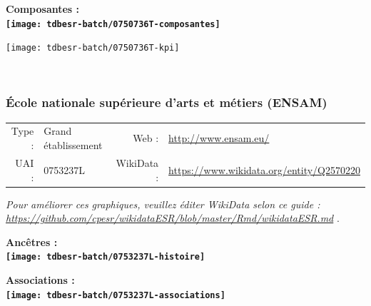 \documentclass[12pt,french,]{article}
\begin{document}
\hrulefill

\begin{center} \bf Composantes : \\  
\texttt{[image: tdbesr-batch/0750736T-composantes]} \end{center}

\begin{center}\texttt{[image: tdbesr-batch/0750736T-kpi]} \end{center}\checkoddpage

\ifoddpage \fi ~\newpage  

\hypertarget{uxe9cole-nationale-supuxe9rieure-darts-et-muxe9tiers-ensam}{%
\subsubsection{École nationale supérieure d'arts et métiers
(ENSAM)}\label{uxe9cole-nationale-supuxe9rieure-darts-et-muxe9tiers-ensam}}

\begin{tabular*}{\textwidth}{rp{5cm}rl}  
\hline  
Type : & Grand établissement & Web : &\href{http://www.ensam.eu/}{http://www.ensam.eu/} \\  
UAI : & 0753237L & WikiData : & \href{https://www.wikidata.org/entity/Q2570220}{https://www.wikidata.org/entity/Q2570220} \\  
\hline  
\end{tabular*}

\textit{\scriptsize Pour améliorer ces graphiques, veuillez éditer WikiData selon ce guide :  \href{https://github.com/cpesr/wikidataESR/blob/master/Rmd/wikidataESR.md}{https://github.com/cpesr/wikidataESR/blob/master/Rmd/wikidataESR.md}}
.

\vspace{1cm}  
\begin{minipage}[b]{0.50\textwidth}\begin{center} \bf Ancêtres : \\  
\texttt{[image: tdbesr-batch/0753237L-histoire]} \end{center}\end{minipage}\begin{minipage}[b]{0.50\textwidth}\begin{center} \bf Associations : \\  
\texttt{[image: tdbesr-batch/0753237L-associations]} \end{center}\end{minipage}

\hrulefill
\end{document}
